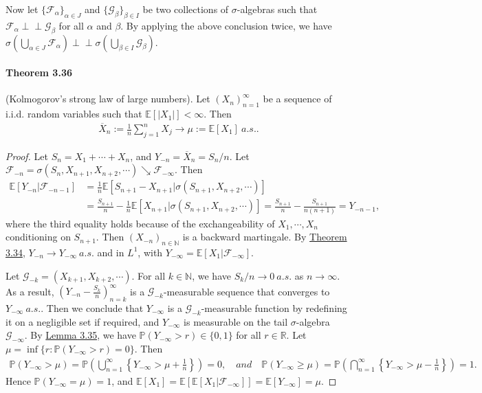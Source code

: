 \documentclass{article}
\numberwithin{equation}{section}
\newcommand{\E}{\mathbb{E}}
\newcommand{\ind}{\perp\!\!\!\perp}
\renewcommand{\P}{\mathbb{P}}
\theoremstyle{plain}
\theoremstyle{definition}
\begin{document}
Now let $\{\mathscr{F}_\alpha\}_{\alpha\in J}$ and $\{\mathscr{G}_\beta\}_{\beta\in I}$ be two collections of $\sigma$-algebras such that $\mathscr{F}_\alpha\ind\mathscr{G}_\beta$ for all $\alpha$ and $\beta$. By applying the above conclusion twice, we have $\sigma\left(\bigcup_{\alpha\in J}\mathscr{F}_\alpha\right)\ind\sigma\left(\bigcup_{\beta\in I}\mathscr{G}_\beta\right)$.

\paragraph{Theorem 3.36\label{thm:3.36}} (Kolmogorov's strong law of large numbers). Let $(X_n)_{n=1}^\infty$ be a sequence of i.i.d. random variables such that $\E[\vert X_1\vert]<\infty$. Then
\begin{align*}
	\overline{X}_n:=\frac{1}{n}\sum_{j=1}^n X_j \to \mu:=\E[X_1]\ a.s..
\end{align*}
\begin{proof}
Let $S_n=X_1+\cdots+X_n$, and $Y_{-n}=\overline{X}_n=S_n/n$. Let $\mathscr{F}_{-n}=\sigma(S_n,X_{n+1},X_{n+2},\cdots)\searrow\mathscr{F}_{-\infty}$. Then
\begin{align*}
	\E[Y_{-n}|\mathscr{F}_{-n-1}]&=\frac{1}{n}\E\left[S_{n+1}-X_{n+1}|\sigma(S_{n+1},X_{n+2},\cdots)\right]\\
	&=\frac{S_{n+1}}{n}-\frac{1}{n}\E\left[X_{n+1}|\sigma(S_{n+1},X_{n+2},\cdots)\right]=\frac{S_{n+1}}{n}-\frac{S_{n+1}}{n(n+1)}=Y_{-n-1},
\end{align*}
where the third equality holds because of the exchangeability of $X_1,\cdots,X_n$ conditioning on $S_{n+1}$. Then $(X_{-n})_{n\in\mathbb{N}}$ is a backward martingale. By \hyperref[thm:3.34]{Theorem 3.34}, $Y_{-n}\to Y_{-\infty}\ a.s.$ and in $L^1$, with $Y_{-\infty}=\E[X_1|\mathscr{F}_{-\infty}]$.\vspace{0.1cm}

Let $\mathscr{G}_{-k}=(X_{k+1},X_{k+2},\cdots)$. For all $k\in\mathbb{N}$, we have $S_k/n\to 0\ a.s.$ as $n\to\infty$. As a result, $(Y_{-n}-\frac{S_k}{n})_{n=k}^\infty$ is a $\mathscr{G}_{-k}$-measurable sequence that converges to $Y_{-\infty}\ a.s.$. Then we conclude that $Y_{-\infty}$ is a $\mathscr{G}_{-k}$-measurable function by redefining it on a negligible set if required, and $Y_{-\infty}$ is measurable on the tail $\sigma$-algebra $\mathscr{G}_{-\infty}$. By \hyperref[lemma:3.35]{Lemma 3.35}, we have $\P(Y_{-\infty}>r)\in\{0,1\}$ for all $r\in\mathbb{R}$. Let $\mu=\inf\{r:\P(Y_{-\infty}>r)=0\}$. Then
\begin{align*}
	\P(Y_{-\infty}>\mu)=\P\left(\bigcup_{n=1}^\infty\left\{Y_{-\infty}>\mu+\frac{1}{n}\right\}\right) = 0,\quad \textit{and}\quad
	\P(Y_{-\infty}\geq\mu)=\P\left(\bigcap_{n=1}^\infty\left\{Y_{-\infty}>\mu-\frac{1}{n}\right\}\right)=1.
\end{align*}
Hence $\P(Y_{-\infty}=\mu)=1$, and $\E[X_1]=\E[\E[X_1|\mathscr{F}_{-\infty}]]=\E[Y_{-\infty}]=\mu$.
\end{proof}
\end{document}
